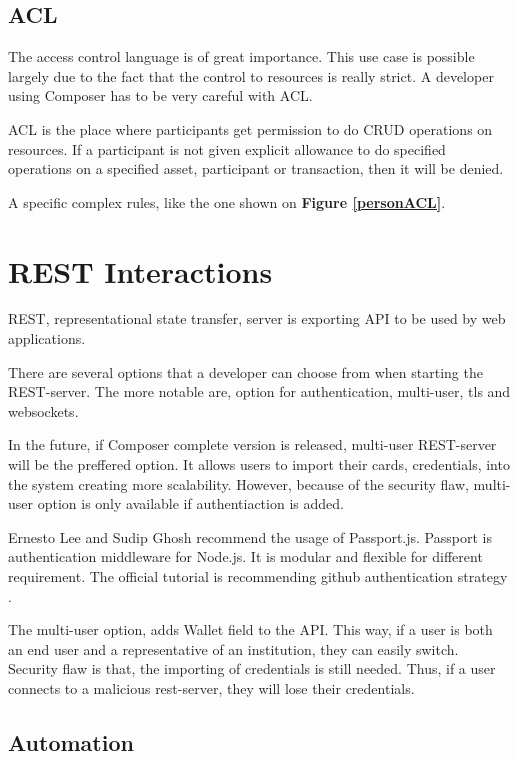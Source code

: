 \documentclass[a4paper,11pt]{report}
\begin{document}
\subsection{ACL}
The access control language is of great importance. This use case is possible largely due to the fact that the control to resources is really strict. A developer using Composer has to be very careful with ACL.

ACL is the place where participants get permission to do CRUD operations on resources. If a participant is not given explicit allowance to do specified operations on a specified asset, participant or transaction, then it will be denied. 

A specific complex rules, like the one shown on \textbf{Figure \ref{personACL}}.

\section{REST Interactions}
\label{rip}
REST, representational state transfer, server is exporting API to be used by web applications. 

There are several options that a developer can choose from when starting the REST-server. The more notable are, option for authentication, multi-user, tls and websockets. 

In the future, if Composer complete version is released, multi-user REST-server will be the preffered option. It allows users to import their cards, credentials, into the system creating more scalability. However, because of the security flaw, multi-user option is only available if authentiaction is added. 

Ernesto Lee and Sudip Ghosh recommend the usage of Passport.js. Passport is authentication middleware for Node.js. It is modular and flexible for different requirement. The official tutorial is recommending github authentication strategy \cite{githubs}.

The multi-user option, adds Wallet field to the API. This way, if a user is both an end user and a representative of an institution, they can easily switch. Security flaw is that, the importing of credentials is still needed. Thus, if a user connects to a malicious rest-server, they will lose their credentials.  

\subsection{Automation}
\end{document}
